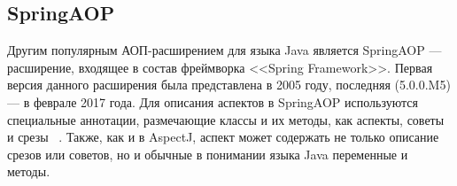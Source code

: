 \documentclass[conference]{IEEEtran}
\begin{document}
\subsection{SpringAOP}

Другим популярным АОП-расширением для языка Java является SpringAOP ---
расширение, входящее в состав фреймворка <<Spring Framework>>.
Первая версия данного расширения была представлена в 2005 году, последняя
(5.0.0.M5) --- в феврале 2017 года.
Для описания аспектов в SpringAOP используются специальные аннотации,
размечающие классы и их методы, как аспекты, советы и срезы
~\cite{springAOP_doc}.
Также, как и в AspectJ, аспект может содержать не только описание срезов или
советов, но и обычные в понимании языка Java переменные и методы.

\end{document}
